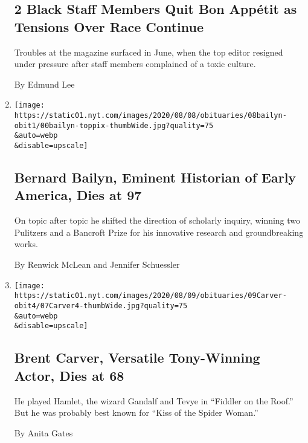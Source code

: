 \begin{enumerate}
  \hypertarget{2-black-staff-members-quit-bon-appuxe9tit-as-tensions-over-race-continue}{%
  \subsection{2 Black Staff Members Quit Bon Appétit as Tensions Over
  Race
  Continue}\label{2-black-staff-members-quit-bon-appuxe9tit-as-tensions-over-race-continue}}

  Troubles at the magazine surfaced in June, when the top editor
  resigned under pressure after staff members complained of a toxic
  culture.

  By Edmund Lee
\item
  \href{/2020/08/07/books/bernard-bailyn-dead.html}{}

  \texttt{[image: https://static01.nyt.com/images/2020/08/08/obituaries/08bailyn-obit1/00bailyn-toppix-thumbWide.jpg?quality=75\\\&auto=webp\\\&disable=upscale]}

  \hypertarget{bernard-bailyn-eminent-historian-of-early-america-dies-at-97}{%
  \subsection{Bernard Bailyn, Eminent Historian of Early America, Dies
  at
  97}\label{bernard-bailyn-eminent-historian-of-early-america-dies-at-97}}

  On topic after topic he shifted the direction of scholarly inquiry,
  winning two Pulitzers and a Bancroft Prize for his innovative research
  and groundbreaking works.

  By Renwick McLean and Jennifer Schuessler
\item
  \href{/2020/08/07/theater/brent-carver-dead.html}{}

  \texttt{[image: https://static01.nyt.com/images/2020/08/09/obituaries/09Carver-obit4/07Carver4-thumbWide.jpg?quality=75\\\&auto=webp\\\&disable=upscale]}

  \hypertarget{brent-carver-versatile-tony-winning-actor-dies-at-68}{%
  \subsection{Brent Carver, Versatile Tony-Winning Actor, Dies at
  68}\label{brent-carver-versatile-tony-winning-actor-dies-at-68}}

  He played Hamlet, the wizard Gandalf and Tevye in ``Fiddler on the
  Roof.'' But he was probably best known for ``Kiss of the Spider
  Woman.''

  By Anita Gates
\end{enumerate}

